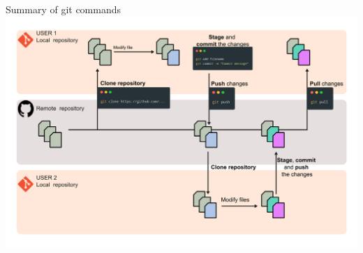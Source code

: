 \documentclass[9pt, aspectratio=169]{beamer}
\begin{document}
\begin{frame}
    {Summary of git commands}
    \centering
    \includegraphics[width=.91\textwidth]{git workflow.png}
\end{frame}
\end{document}
